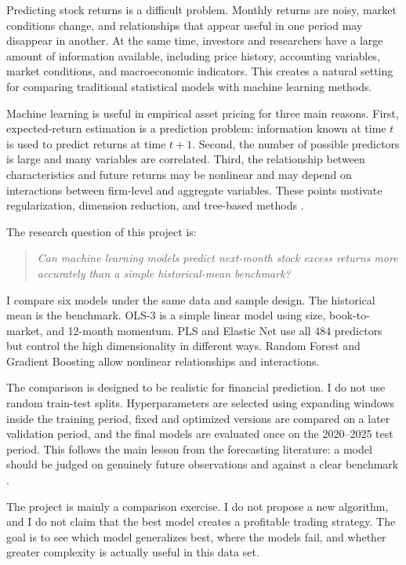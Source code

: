 \documentclass[11pt,a4paper]{article}
\begin{document}
Predicting stock returns is a difficult problem. Monthly returns are noisy,
market conditions change, and relationships that appear useful in one period
may disappear in another. At the same time, investors and researchers have a
large amount of information available, including price history, accounting
variables, market conditions, and macroeconomic indicators. This creates a
natural setting for comparing traditional statistical models with machine
learning methods.

Machine learning is useful in empirical asset pricing for three main reasons.
First, expected-return estimation is a prediction problem: information known at
time \(t\) is used to predict returns at time \(t+1\). Second, the number of
possible predictors is large and many variables are correlated. Third, the
relationship between characteristics and future returns may be nonlinear and
may depend on interactions between firm-level and aggregate variables. These
points motivate regularization, dimension reduction, and tree-based methods
\parencite{gu2020empirical}.

The research question of this project is:

\begin{quote}
\emph{Can machine learning models predict next-month stock excess returns more
accurately than a simple historical-mean benchmark?}
\end{quote}

I compare six models under the same data and sample design. The historical mean
is the benchmark. OLS-3 is a simple linear model using size, book-to-market, and
12-month momentum. PLS and Elastic Net use all 484 predictors but control the
high dimensionality in different ways. Random Forest and Gradient Boosting
allow nonlinear relationships and interactions.

The comparison is designed to be realistic for financial prediction. I do not
use random train-test splits. Hyperparameters are selected using expanding
windows inside the training period, fixed and optimized versions are compared
on a later validation period, and the final models are evaluated once on the
2020--2025 test period. This follows the main lesson from the forecasting
literature: a model should be judged on genuinely future observations and
against a clear benchmark \parencite{welch2008comprehensive}.

The project is mainly a comparison exercise. I do not propose a new algorithm,
and I do not claim that the best model creates a profitable trading strategy.
The goal is to see which model generalizes best, where the models fail, and
whether greater complexity is actually useful in this data set.
\end{document}

